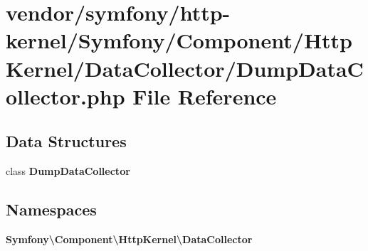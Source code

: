 \section{vendor/symfony/http-\/kernel/\+Symfony/\+Component/\+Http\+Kernel/\+Data\+Collector/\+Dump\+Data\+Collector.php File Reference}
\label{_dump_data_collector_8php}
\subsection*{Data Structures}
\begin{DoxyCompactItemize}
\item 
class {\bf Dump\+Data\+Collector}
\end{DoxyCompactItemize}
\subsection*{Namespaces}
\begin{DoxyCompactItemize}
\item 
 {\bf Symfony\textbackslash{}\+Component\textbackslash{}\+Http\+Kernel\textbackslash{}\+Data\+Collector}
\end{DoxyCompactItemize}
